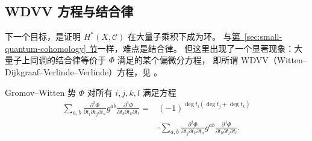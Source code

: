 \subsection{WDVV 方程与结合律}\label{subsec:wdvv-associativity}
下一个目标，是证明 $H^*(X,\mathcal C)$ 在大量子乘积下成为环。
与\hyperref[sec:small-quantum-cohomology]{第~\ref*{sec:small-quantum-cohomology} 节}一样，难点是结合律。
但这里出现了一个显著现象：大量子上同调的结合律等价于 $\Phi$ 满足的某个偏微分方程，
即所谓 WDVV（Witten--Dijkgraaf--Verlinde--Verlinde）方程，见 。
\begin{theorem}\label{thm:wdvv}
Gromov--Witten 势 $\Phi$ 对所有 $i,j,k,l$ 满足方程
\[
\begin{aligned}
\sum_{a,b}\frac{\partial^3\Phi}{\partial t_i\partial t_j\partial t_a}g^{ab}
\frac{\partial^3\Phi}{\partial t_b\partial t_k\partial t_l}
={}&(-1)^{\deg t_i(\deg t_j+\deg t_k)}\\
&\cdot\sum_{a,b}\frac{\partial^3\Phi}{\partial t_j\partial t_k\partial t_a}g^{ab}
\frac{\partial^3\Phi}{\partial t_b\partial t_i\partial t_l}.
\end{aligned}
\]
\end{theorem}
